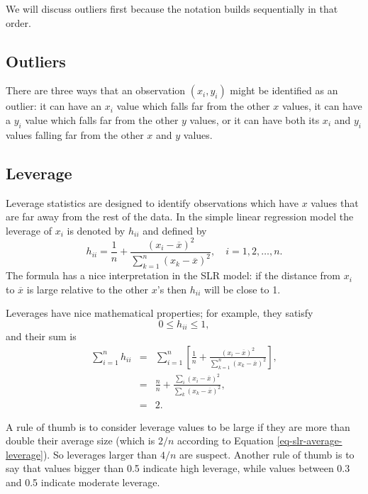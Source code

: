 \documentclass[captions=tableheading]{scrbook}
\begin{document}
We will discuss outliers first because the notation builds sequentially in that order.
\subsection{Outliers}
\label{sec-11-5-1}

There are three ways that an observation \((x_{i},y_{i})\) might be identified as an  outlier: it can have an \(x_{i}\) value which falls far from the other  \(x\) values, it can have a \(y_{i}\) value which falls far from the other \(y\) values, or it can have both its \(x_{i}\) and \(y_{i}\) values falling far from the other \(x\) and \(y\) values.
\subsection{Leverage}
\label{sec-11-5-2}

Leverage statistics are designed to identify observations which have \(x\) values that are far away from the rest of the data. In the simple linear regression model the leverage of \(x_{i}\) is denoted by \(h_{ii}\) and defined by 
\begin{equation}
h_{ii}=\frac{1}{n}+\frac{(x_{i}-\overline{x})^{2}}{\sum_{k=1}^{n}(x_{k}-\overline{x})^{2}},\quad i=1,2,\ldots,n.
\end{equation}
The formula has a nice interpretation in the SLR model: if the distance from \(x_{i}\) to \(\overline{x}\) is large relative to the other \(x\)'s then \(h_{ii}\) will be close to 1. 

Leverages have nice mathematical properties; for example, they satisfy
\begin{equation}
0\leq h_{ii}\leq1,\label{eq-slr-leverage-between}
\end{equation}
and their sum is
\begin{eqnarray}
\sum_{i=1}^{n}h_{ii} & = & \sum_{i=1}^{n}\left[\frac{1}{n}+\frac{(x_{i}-\overline{x})^{2}}{\sum_{k=1}^{n}(x_{k}-\overline{x})^{2}}\right],\\
 & = & \frac{n}{n}+\frac{\sum_{i}(x_{i}-\overline{x})^{2}}{\sum_{k}(x_{k}-\overline{x})^{2}},\\
 & = & 2.\label{eq-slr-average-leverage}
\end{eqnarray}

A rule of thumb is to consider leverage values to be large if they are more than double their average size (which is \(2/n\) according to Equation \ref{eq-slr-average-leverage}). So leverages larger than \(4/n\) are suspect. Another rule of thumb is to say that values bigger than 0.5 indicate high leverage, while values between 0.3 and 0.5 indicate moderate leverage.
\end{document}
